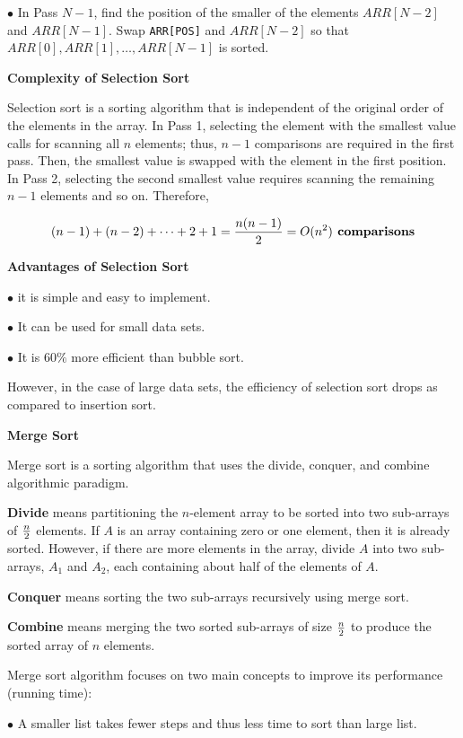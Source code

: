 \vskip 3mm
\qquad$\bullet$ In Pass $N-1$, find the position of the smaller of the elements $ARR[N-2]$ and $ARR[N - 1]$. Swap {\tt ARR[POS]} and $ARR[N-2]$ so that $ARR[0], ARR[1],\ldots, ARR[N-1]$ is sorted.

\vskip 3mm
{\bf Complexity of Selection Sort}

\vskip 1mm
Selection sort is a sorting algorithm that is independent of the original order of the elements in the array. In Pass 1, selecting the element with the smallest value calls for scanning all $n$ elements; thus, $n-1$ comparisons are required in the first pass. Then, the smallest value is swapped with the element in the first position. In Pass 2, selecting the second smallest value requires scanning the remaining $n-1$ elements and so on. Therefore,

$$(n-1)+(n-2)+\cdots+2+1={n(n-1)\over 2}=O(n^2)\hbox{\bf{} comparisons}$$

\vskip 3mm
{\bf Advantages of Selection Sort}

\vskip 3mm
\qquad$\bullet$ it is simple and easy to implement.

\vskip 3mm
\qquad$\bullet$ It can be used for small data sets.

\vskip 3mm
\qquad$\bullet$ It is $60\%$ more efficient than bubble sort.

\vskip 1mm
However, in the case of large data sets, the efficiency of selection sort drops as compared to insertion sort.

\filbreak
\vskip 1cm
{\bf Merge Sort}

\vskip 1mm
Merge sort is a sorting algorithm that uses the divide, conquer, and combine algorithmic paradigm.

\vskip 3mm
{\bf Divide} means partitioning the $n$-element array to be sorted into two sub-arrays of ${n\over 2}$ elements. If $A$ is an array containing zero or one element, then it is already sorted. However, if there are more elements in the array, divide $A$ into two sub-arrays, $A_1$ and $A_2$, each containing about half of the elements of $A$.

\vskip 3mm
{\bf Conquer} means sorting the two sub-arrays recursively using merge sort.

\vskip 3mm
{\bf Combine} means merging the two sorted sub-arrays of size ${n\over 2}$ to produce the sorted array of $n$ elements.

\vskip 1mm
Merge sort algorithm focuses on two main concepts to improve its performance (running time):

\vskip 3mm
\qquad$\bullet$ A smaller list takes fewer steps and thus less time to sort than large list.

